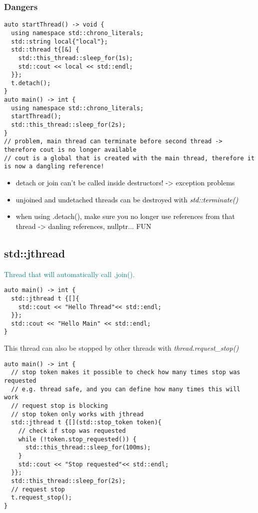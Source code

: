 \documentclass[main.tex,fontsize=8pt,paper=a4,paper=portrait,DIV=calc,]{scrartcl}
\begin{document}
\subsubsection{Dangers}
\begin{lstlisting}
auto startThread() -> void {
  using namespace std::chrono_literals;
  std::string local{"local"};
  std::thread t{[&] {
    std::this_thread::sleep_for(1s);
    std::cout << local << std::endl;
  }};
  t.detach();
}
auto main() -> int {
  using namespace std::chrono_literals;
  startThread();
  std::this_thread::sleep_for(2s);
}
// problem, main thread can terminate before second thread -> therefore cout is no longer available
// cout is a global that is created with the main thread, therefore it is now a dangling reference!
\end{lstlisting}

\begin{itemize}
\item \textcolor{black}{detach or join can't be called inside destructors! -> exception problems}
\item \textcolor{black}{unjoined and undetached threads can be destroyed with \emph{std::terminate()}}
\item \textcolor{black}{when using .detach(), make sure you no longer use references from that thread -> danling references, nullptr... FUN}
\end{itemize} 

\subsection{std::jthread}
\textcolor{teal}{Thread that will automatically call .join().}
\begin{lstlisting}
auto main() -> int {
  std::jthread t {[]{
    std::cout << "Hello Thread"<< std::endl;
  }};
  std::cout << "Hello Main" << std::endl;
}
\end{lstlisting}
This thread can also be stopped by other threads with \emph{thread.request\_stop()}
\begin{lstlisting}
auto main() -> int {
  // stop token makes it possible to check how many times stop was requested
  // e.g. thread safe, and you can define how many times this will work
  // request stop is blocking
  // stop token only works with jthread
  std::jthread t {[](std::stop_token token){
    // check if stop was requested
    while (!token.stop_requested()) {
      std::this_thread::sleep_for(100ms);
    }
    std::cout << "Stop requested"<< std::endl;
  }};
  std::this_thread::sleep_for(2s);
  // request stop
  t.request_stop();
}
\end{lstlisting}
\end{document}
